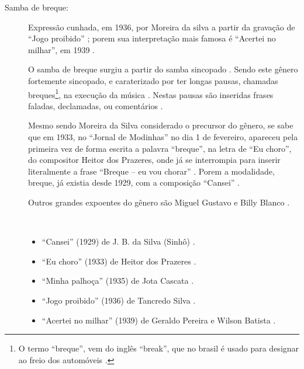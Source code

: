\begin{description}
\item[Samba de breque:] 

Expressão cunhada, em 1936, por Moreira da silva a partir da gravação de ``Jogo proibido'' \cite[pp. 291]{dourado2004dicionario};
porem sua interpretação mais famosa é ``Acertei no milhar'', em 1939 \cite[pp. 129]{perna2002samba}.

O samba de breque surgiu a partir do samba sincopado \cite[pp. 129]{perna2002samba}.
Sendo este gênero fortemente sincopado, 
e caraterizado por ter longas pausas, chamadas breques\footnote{
O termo ``breque'', vem do inglês ``break'', 
que no brasil é usado para designar ao freio dos automóveis \cite[pp. 684]{marcondes1977enciclopediav2}.}, 
na execução da música \cite[pp. 291]{dourado2004dicionario}.
Nestas pausas são inseridas frases faladas, declamadas, ou comentários \cite[pp. 129]{perna2002samba} \cite[pp. 291]{dourado2004dicionario}. 


Mesmo sendo Moreira da Silva considerado o precursor do gênero, 
se sabe que em 1933, no ``Jornal de Modinhas'' no dia 1 de fevereiro, 
apareceu pela primeira vez de forma escrita a palavra ``breque'', na letra de ``Eu choro'', 
do compositor Heitor dos Prazeres, onde já se interrompia para inserir literalmente 
a frase ``Breque -- eu vou chorar'' \cite[pp. 291]{dourado2004dicionario} \cite{rizzi2016musica}.
Porem a modalidade, breque, já existia desde 1929, com a composição ``Cansei'' \cite{rizzi2016musica}.

Outros grandes expoentes do gênero são Miguel Gustavo e Billy Blanco \cite[pp. 291]{dourado2004dicionario}.

\begin{example} ~

\begin{itemize}
\item ``Cansei'' (1929) de J. B. da Silva (Sinhô) \cite{rizzi2016musica} \cite{aguiar2013reis}.
\item ``Eu choro'' (1933) de Heitor dos Prazeres  \cite[pp. 291]{dourado2004dicionario}.
\item ``Minha palhoça'' (1935) de Jota Cascata \cite{aguiar2013reis}.
\item ``Jogo proibido'' (1936) de Tancredo Silva \cite{rizzi2016musica}.
\item ``Acertei no milhar'' (1939) de Geraldo Pereira e Wilson Batista \cite[pp. 129]{perna2002samba}.
\end{itemize}
\end{example}




\end{description}
